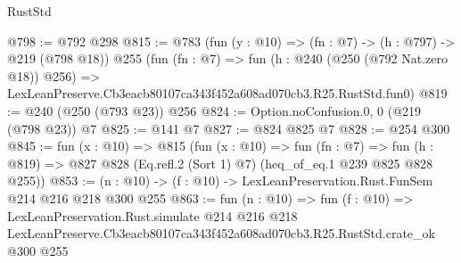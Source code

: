 \begin{lexlean}{RustStd}
\begin{coremodule}
@798 := @792 @298
@815 := @783
    (fun (y : @10) => (fn : @7) -> (h : @797) -> @219 (@798 @18))
    @255
    (fun (fn : @7) =>
    fun (h : @240 (@250 (@792 Nat.zero @18)) @256) =>
    LexLeanPreserve.Cb3eacb80107ca343f452a608ad070cb3.R25.RustStd.fun0)
@819 := @240 (@250 (@793 @23)) @256
@824 := Option.noConfusion.{0, 0} (@219 (@798 @23)) @7
@825 := @141 @7
@827 := @824 @825 @7
@828 := @254 @300
@845 := fun (x : @10) =>
  @815
    (fun (x : @10) =>
    fun (fn : @7) =>
    fun (h : @819) => @827 @828 (Eq.refl.{2} (Sort 1) @7) (heq_of_eq.{1} @239 @825 @828 @255))
@853 := (n : @10) -> (f : @10) -> LexLeanPreservation.Rust.FunSem @214 @216 @218 @300 @255
@863 := fun (n : @10) =>
  fun (f : @10) =>
  LexLeanPreservation.Rust.simulate
    @214
    @216
    @218
    LexLeanPreserve.Cb3eacb80107ca343f452a608ad070cb3.R25.RustStd.crate_ok
    @300
    @255
\end{coremodule}
\end{lexlean}
